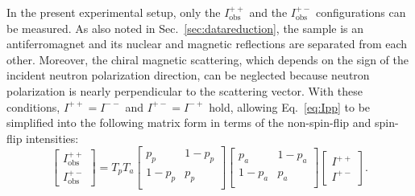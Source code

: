 \documentclass[%
 reprint,
superscriptaddress,
 amsmath,amssymb,
 aps,
floatfix,
]{revtex4-2}
\begin{document}
In the present experimental setup, only the $I^{++}_\mathrm{obs}$ and the $I^{+-}_\mathrm{obs}$ configurations can be measured.
As also noted in Sec.~\ref{sec:datareduction}, the sample is an antiferromagnet and its nuclear and magnetic reflections are separated from each other.
Moreover, the chiral magnetic scattering, which depends on the sign of the incident neutron polarization direction, can be neglected because neutron polarization is nearly perpendicular to the scattering vector.
With these conditions, $I^{++} = I^{--}$ and $I^{+-} = I^{-+}$ hold, allowing Eq.~\ref{eq:Ipp} to be simplified into the following matrix form in terms of the non-spin-flip and spin-flip intensities:
\begin{equation}
    \begin{bmatrix}
        I^{++}_\mathrm{obs} \\
        I^{+-}_\mathrm{obs}
    \end{bmatrix}
    =
    T_pT_a
    \begin{bmatrix}
        p_p & 1-p_p \\
        1-p_p & p_p \\
    \end{bmatrix}
    \begin{bmatrix}
        p_a&1-p_a \\
        1-p_a&p_a \\
    \end{bmatrix}
    \begin{bmatrix}
        I^{++} \\
        I^{+-}
    \end{bmatrix}.
    \label{eq:Ipp_Ipm}
\end{equation}
\end{document}
